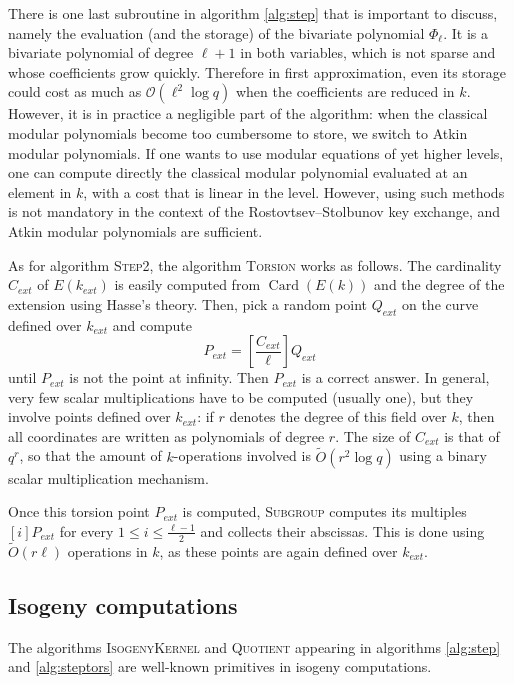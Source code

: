 \documentclass{article}
\renewcommand{\O}{\mathcal{O}}
\newcommand{\softO}{\tilde{O}}
\newcommand{\algstyle}[1]{\textsc{#1}}
\renewcommand{\v}{\vspace{5mm}}
\theoremstyle{definition}
\DeclareMathOperator{\Card}{Card}
\begin{document}
There is one last subroutine in algorithm \ref{alg:step} that is important to discuss,
namely the evaluation (and the storage) of the bivariate polynomial $\Phi_\ell$. It is a bivariate
polynomial of degree $\ell + 1$ in both variables, which is not sparse and whose coefficients
grow quickly. Therefore in first approximation, even its storage could cost as much as
$\O(\ell^2 \log q)$ when the coefficients are reduced in $k$. However, it is in practice a negligible
part of the algorithm: when the classical modular polynomials become too cumbersome to store, we
switch to Atkin modular polynomials. If one wants to use modular equations of yet higher levels,
one can compute directly the classical modular polynomial evaluated at an element in $k$,
with a cost that is linear in the level. However, using such methods is not mandatory in
the context of the Rostovtsev--Stolbunov key exchange, and Atkin modular polynomials are
sufficient.
\v

As for algorithm \algstyle{Step2}, the algorithm \algstyle{Torsion} works as follows.
The cardinality $C_{ext}$ of $E(k_{ext})$ is easily computed from $\Card(E(k))$
and the degree of the extension using Hasse's theory.
Then, pick a random point $Q_{ext}$ on the curve defined over $k_{ext}$ and compute
\[
P_{ext} = \left[\frac{C_{ext}}{\ell}\right]Q_{ext}
\]
until $P_{ext}$ is not the point at infinity. Then $P_{ext}$ is a correct answer.
In general, very few scalar multiplications have to be computed (usually one),
but they involve points defined over $k_{ext}$: if $r$ denotes the degree of
this field over $k$, then all coordinates are written as polynomials of degree
$r$. The size of $C_{ext}$ is that of $q^r$, so that the amount of $k$-operations
 involved is $\softO(r^2\log q)$ using a binary scalar multiplication mechanism.

Once this torsion point $P_{ext}$ is computed, \algstyle{Subgroup} computes its
multiples $[i]P_{ext}$ for every $1\leq i\leq \frac{\ell - 1}{2}$ and collects
their abscissas. This is done using $\softO(r\ell)$ operations in $k$, as
these points are again defined over $k_{ext}$.

\subsection{Isogeny computations}

The algorithms \algstyle{IsogenyKernel} and \algstyle{Quotient} appearing in
algorithms \ref{alg:step} and \ref{alg:steptors} are well-known primitives in isogeny
computations. 
\end{document}
